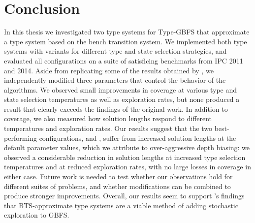 \chapter{Conclusion}

In this thesis we investigated two type systems for Type-GBFS that approximate a type system based on the bench transition system. We implemented both type systems with variants for different type and state selection strategies, and evaluated all configurations on a suite of satisficing benchmarks from IPC 2011 and 2014. Aside from replicating some of the results obtained by , we independently modified three parameters that control the behavior of the algorithms. We observed small improvements in coverage at various type and state selection temperatures as well as exploration rates, but none produced a result that clearly exceeds the findings of the original work. In addition to coverage, we also measured how solution lengths respond to different temperatures and exploration rates. Our results suggest that the two best-performing configurations, \hiDu and \hiDh, suffer from increased solution lengths at the default parameter values, which we attribute to over-aggressive depth biasing: we observed a considerable reduction in solution lengths at increased type selection temperatures and at reduced exploration rates, with no large losses in coverage in either case. Future work is needed to test whether our observations hold for different suites of problems, and whether modifications can be combined to produce stronger improvements. Overall, our results seem to support 's findings that BTS-approximate type systems are a viable method of adding stochastic exploration to GBFS.
